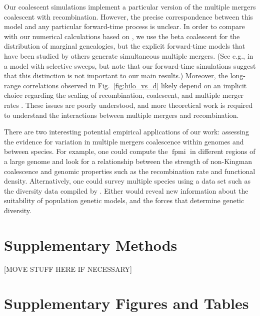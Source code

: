\documentclass[11pt, letterpaper]{article}   	%
\newcommand{\fig}[1]{Fig.~\ref{#1}}
\DeclareMathOperator{\fpmi}{fpmi}
\begin{document}
Our coalescent simulations implement a particular version of the multiple mergers coalescent with recombination.
However, the precise correspondence between this model and any particular forward-time process is unclear.
In order to compare with our numerical calculations based on \cite{BirknerEtAl2013}, we use the beta coalescent for the distribution of marginal genealogies, but the explicit forward-time models that have been studied by others generate simultaneous multiple mergers.
(See e.g., \cite{DurrettSchweinsberg2005} in a model with selective sweeps, but note that our forward-time simulations suggest that this distinction is not important to our main results.)
Moreover, the long-range correlations observed in \fig{fig:hilo_vs_d} likely depend on an implicit choice regarding the scaling of recombination, coalescent, and multiple merger rates \autocite{EldonWakeley2006}.
These issues are poorly understood, and more theoretical work is required to understand the interactions between multiple mergers and recombination.

There are two interesting potential empirical applications of our work: assessing the evidence for variation in multiple mergers coalescence within genomes and between species.
For example, one could compute the $\fpmi$ in different regions of a large genome and look for a relationship between the strength of non-Kingman coalescence and genomic properties such as the recombination rate and functional density.
Alternatively, one could survey multiple species using a data set such as the diversity data compiled by \cite{Corbett-DetigEtAl2015}.
Either would reveal new information about the suitability of population genetic models, and the forces that determine genetic diversity.

\printbibliography

\section*{Supplementary Methods}
[MOVE STUFF HERE IF NECESSARY]

\clearpage

\section*{Supplementary Figures and Tables}
\end{document}
